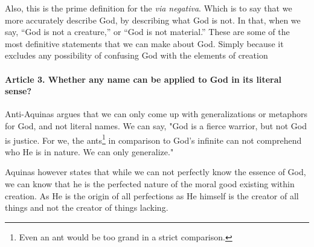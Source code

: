 \documentclass{ucetd}
\begin{document}
Also, this is the prime definition for the \textit{via negativa}. Which is to say that we more accurately describe God, by describing what God is not. In that, when we say, ``God is not a creature,'' or ``God is not material.'' These are some of the most definitive statements that we can make about God. Simply because it excludes any possibility of confusing God with the elements of creation

\paragraph{Article 3. Whether any name can be applied to God in its literal sense?}
Anti-Aquinas argues that we can only come up with generalizations or metaphors for God, and not literal names. We can say, "God is a fierce warrior, but not God is justice. For we, the ants\footnote{Even an ant would be too grand in a strict comparison.} in comparison to God's infinite can not comprehend who He is in nature. We can only generalize."

Aquinas however states that while we can not perfectly know the essence of God, we can know that he is the perfected nature of the moral good existing within creation. As He is the origin of all perfections as He himself is the creator of all things and not the creator of things lacking.
\end{document}

